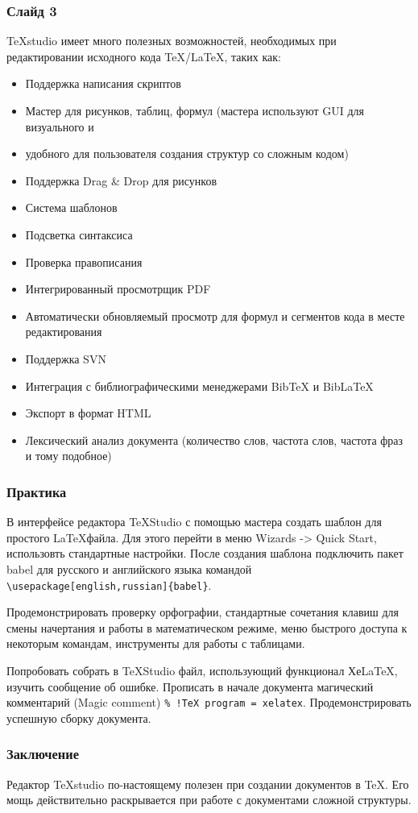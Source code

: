 \documentclass[11pt,a4paper]{article}
\begin{document}
	\subsubsection*{Слайд 3}
	TeXstudio имеет много полезных возможностей, необходимых при редактировании исходного кода \TeX/\LaTeX, таких как:
	\begin{itemize}
		\item Поддержка написания скриптов
		\item Мастер для рисунков, таблиц, формул (мастера используют GUI для визуального и \item удобного для пользователя создания структур со сложным кодом)
		\item Поддержка Drag \& Drop для рисунков
		\item Система шаблонов
		\item Подсветка синтаксиса
		\item Проверка правописания
		\item Интегрированный просмотрщик PDF
		\item Автоматически обновляемый просмотр для формул и сегментов кода в месте редактирования
		\item Поддержка SVN
		\item Интеграция с библиографическими менеджерами BibTeX и BibLaTeX
		\item Экспорт в формат HTML
		\item Лексический анализ документа (количество слов, частота слов, частота фраз и тому подобное)
	\end{itemize}
	\newpage
	\subsubsection*{Практика}
	В интерфейсе редактора TeXStudio с помощью мастера создать шаблон для простого \LaTeX файла. Для этого перейти в меню Wizards -> Quick Start, использовть стандартные настройки. После создания шаблона подключить пакет babel для русского и английского языка командой \texttt{\textbackslash usepackage[english,russian]\{babel\}}.
	
	Продемонстрировать проверку орфографии, стандартные сочетания клавиш для смены начертания и работы в математическом режиме, меню быстрого доступа к некоторым командам, инструменты для работы с таблицами. 
	
	Попробовать собрать в TeXStudio файл, использующий функционал ХеLaTeX, изучить сообщение об ошибке. Прописать в начале документа магический комментарий (Magic comment) \texttt{\% !TeX program = xelatex}. Продемонстрировать успешную сборку документа.
	
	\subsubsection*{Заключение}
	Редактор TeXstudio по-настоящему полезен при создании документов в \TeX. Его мощь действительно раскрывается при работе с документами сложной структуры.
\end{document}
